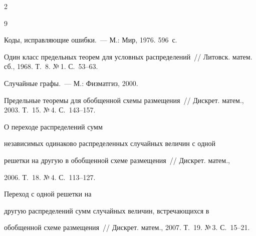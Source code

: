 \begin{multicols}{2}
{\small\frenchspacing


{%




\begin{thebibliography}{9}









Коды, исправляющие ошибки.~--- М.: Мир, 1976. 596~с.









Один класс предельных теорем для условных распределений~// Литовск. матем. сб., 1968. Т.~8. №\,1. С.~53--63.







 Случайные графы.~--- М.: Физматгиз, 2000.









Предельные теоремы для обобщенной схемы размещения~// Дискрет. матем., 2003. Т.~15. №\,4. С.~143--157.









О переходе распределений сумм


независимых одинаково распределенных случайных величин с одной


решетки на другую в обобщенной схеме размещения~// Дискрет. матем.,


2006. Т.~18. №\,4. С.~113--127.







 Переход с одной решетки на


другую распределений сумм случайных величин, встречающихся в


обобщенной схеме размещения~// Дискрет. матем., 2007. Т.~19. №\,3. С.~15--21.






\end{thebibliography}}}
\end{multicols}

